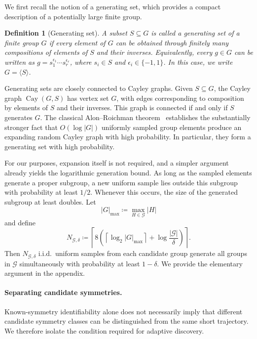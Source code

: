 \documentclass[11pt]{article}
\theoremstyle{plain}
\newtheorem{definition}[theorem]{Definition}
\theoremstyle{definition}
\theoremstyle{remark}
\begin{document}
We first recall the notion of a generating set, which provides a compact
description of a potentially large finite group.

\begin{definition}[Generating set]
A subset \(S\subseteq G\) is called a \emph{generating set} of a finite group
\(G\) if every element of \(G\) can be obtained through finitely many
compositions of elements of \(S\) and their inverses. Equivalently, every
\(g\in G\) can be written as
\(g=s_1^{\epsilon_1}\cdots s_r^{\epsilon_r}\), where
\(s_i\in S\) and \(\epsilon_i\in\{-1,1\}\). In this case, we write
\(G=\langle S\rangle\).
\end{definition}

Generating sets are closely connected to Cayley graphs. Given \(S\subseteq G\),
the Cayley graph \(\operatorname{Cay}(G,S)\) has vertex set \(G\), with edges
corresponding to composition by elements of \(S\) and their inverses. This
graph is connected if and only if \(S\) generates \(G\). The classical
Alon--Roichman theorem~\citep{alon1994random} establishes the substantially
stronger fact that \(O(\log |G|)\) uniformly sampled group elements produce an
expanding random Cayley graph with high probability. In particular, they form
a generating set with high probability.

For our purposes, expansion itself is not required, and a simpler argument
already yields the logarithmic generation bound. As long as the sampled
elements generate a proper subgroup, a new uniform sample lies outside this
subgroup with probability at least \(1/2\). Whenever this occurs, the size of
the generated subgroup at least doubles. Let
\[
|G|_{\max}\coloneqq\max_{H\in\mathcal G}|H|
\]
and define
\[
N_{\mathcal G,\delta}
\coloneqq
\left\lceil
8\left(
\left\lceil\log_2|G|_{\max}\right\rceil
+\log\frac{|\mathcal G|}{\delta}
\right)
\right\rceil.
\]
Then \(N_{\mathcal G,\delta}\) i.i.d.\ uniform samples from each candidate
group generate all groups in \(\mathcal G\) simultaneously with probability
at least \(1-\delta\). We provide the elementary argument in the appendix.

\paragraph{Separating candidate symmetries.}
Known-symmetry identifiability alone does not necessarily imply that different
candidate symmetry classes can be distinguished from the same short
trajectory. We therefore isolate the condition required for adaptive
discovery.
\end{document}
